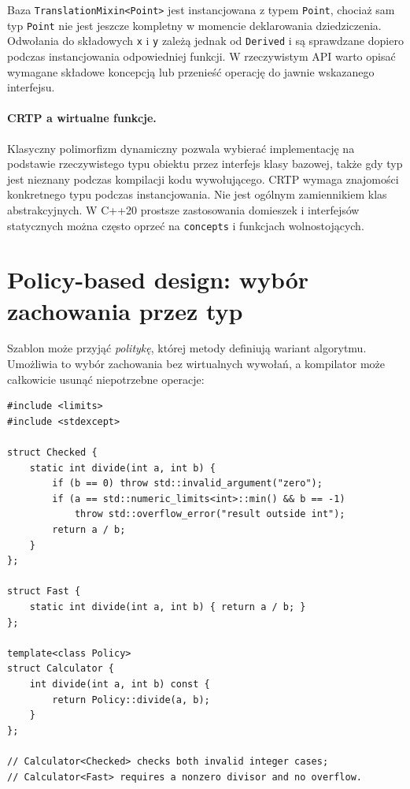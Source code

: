 Baza \texttt{TranslationMixin<Point>} jest instancjowana z typem
\texttt{Point}, chociaż sam typ \texttt{Point} nie jest jeszcze
kompletny w momencie deklarowania dziedziczenia. Odwołania do składowych
\texttt{x} i \texttt{y} zależą jednak od \texttt{Derived} i są
sprawdzane dopiero podczas instancjowania odpowiedniej funkcji.
W rzeczywistym API warto opisać wymagane składowe koncepcją lub
przenieść operację do jawnie wskazanego interfejsu.

\paragraph{CRTP a wirtualne funkcje.}
Klasyczny polimorfizm dynamiczny pozwala wybierać implementację
na podstawie rzeczywistego typu obiektu przez interfejs klasy bazowej,
także gdy typ jest nieznany podczas kompilacji kodu wywołującego.
CRTP wymaga znajomości konkretnego typu podczas instancjowania.
Nie jest ogólnym zamiennikiem klas abstrakcyjnych. W C++20 prostsze
zastosowania domieszek i interfejsów statycznych można często oprzeć
na \texttt{concepts} i funkcjach wolnostojących.

\section{Policy-based design: wybór zachowania przez typ}
\label{sec:cpp9-policy}

Szablon może przyjąć \emph{politykę}, której metody definiują wariant
algorytmu. Umożliwia to wybór zachowania bez wirtualnych wywołań,
a kompilator może całkowicie usunąć niepotrzebne operacje:

\begin{lstlisting}
#include <limits>
#include <stdexcept>

struct Checked {
    static int divide(int a, int b) {
        if (b == 0) throw std::invalid_argument("zero");
        if (a == std::numeric_limits<int>::min() && b == -1)
            throw std::overflow_error("result outside int");
        return a / b;
    }
};

struct Fast {
    static int divide(int a, int b) { return a / b; }
};

template<class Policy>
struct Calculator {
    int divide(int a, int b) const {
        return Policy::divide(a, b);
    }
};

// Calculator<Checked> checks both invalid integer cases;
// Calculator<Fast> requires a nonzero divisor and no overflow.
\end{lstlisting}

